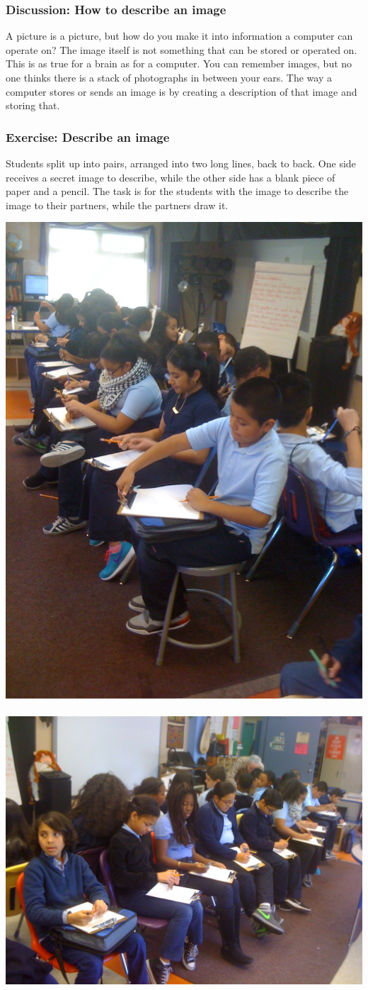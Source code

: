 \documentclass[11pt]{article}
\begin{document}
\subsubsection{Discussion: How to describe an image}

A picture is a picture, but how do you make it into information a
computer can operate on?  The image itself is not something that can
be stored or operated on.  This is as true for a brain as for a
computer.  You can remember images, but no one thinks there is a stack
of photographs in between your ears.  The way a computer stores or
sends an image is by creating a description of that image and storing
that.

\subsubsection{Exercise: Describe an image}

Students split up into pairs, arranged into two long lines, back to
back.  One side receives a secret image to describe, while the other
side has a blank piece of paper and a pencil.  The task is for the
students with the image to describe the image to their partners, while
the partners draw it.

\begin{center}
\includegraphics[width=0.35\columnwidth]{pix-for-presentation/IMG_0494.jpg}~\includegraphics[width=0.62\columnwidth]{pix-for-presentation/IMG_0495.jpg}
\end{center}
\end{document}

